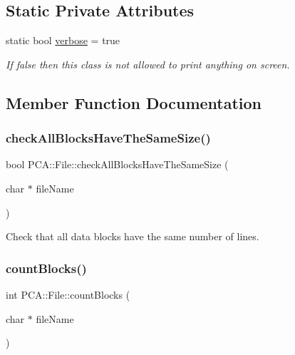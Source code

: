 \subsection*{Static Private Attributes}
\begin{DoxyCompactItemize}
\item 
static bool \hyperlink{class_p_c_a_1_1_file_a7d78765563f9be7e1ca260dcd3c65053}{verbose} = true
\begin{DoxyCompactList}\small\item\em If false then this class is not allowed to print anything on screen. \end{DoxyCompactList}\end{DoxyCompactItemize}


\subsection{Member Function Documentation}
\hypertarget{class_p_c_a_1_1_file_aee5a821758a1c8f582a3ffc4be046e8d}{}\label{class_p_c_a_1_1_file_aee5a821758a1c8f582a3ffc4be046e8d} 
\subsubsection{\texorpdfstring{check\+All\+Blocks\+Have\+The\+Same\+Size()}{checkAllBlocksHaveTheSameSize()}}
{\footnotesize\ttfamily bool P\+C\+A\+::\+File\+::check\+All\+Blocks\+Have\+The\+Same\+Size (\begin{DoxyParamCaption}\item[{char $\ast$}]{file\+Name }\end{DoxyParamCaption})\hspace{0.3cm}{\ttfamily [static]}}



Check that all data blocks have the same number of lines. 

\hypertarget{class_p_c_a_1_1_file_a25bcd550fcc9e0a948f4c553b330a7a6}{}\label{class_p_c_a_1_1_file_a25bcd550fcc9e0a948f4c553b330a7a6} 
\subsubsection{\texorpdfstring{count\+Blocks()}{countBlocks()}}
{\footnotesize\ttfamily int P\+C\+A\+::\+File\+::count\+Blocks (\begin{DoxyParamCaption}\item[{char $\ast$}]{file\+Name }\end{DoxyParamCaption})\hspace{0.3cm}{\ttfamily [static]}}



